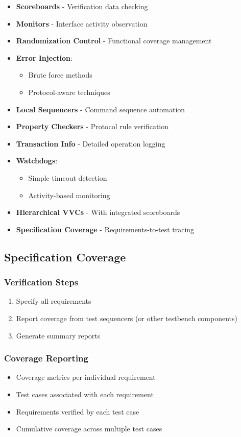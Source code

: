 \documentclass{article}
\begin{document}
\begin{itemize}
    \item \textbf{Scoreboards} - Verification data checking
    \item \textbf{Monitors} - Interface activity observation
    \item \textbf{Randomization Control} - Functional coverage management
    \item \textbf{Error Injection}:
    \begin{itemize}
        \item Brute force methods
        \item Protocol-aware techniques
    \end{itemize}
    \item \textbf{Local Sequencers} - Command sequence automation
    \item \textbf{Property Checkers} - Protocol rule verification
    \item \textbf{Transaction Info} - Detailed operation logging
    \item \textbf{Watchdogs}:
    \begin{itemize}
        \item Simple timeout detection
        \item Activity-based monitoring
    \end{itemize}
    \item \textbf{Hierarchical VVCs} - With integrated scoreboards
    \item \textbf{Specification Coverage} - Requirements-to-test tracing
\end{itemize}

\subsection{Specification Coverage}

\subsubsection*{Verification Steps}
\begin{enumerate}
    \item Specify all requirements
    \item Report coverage from test sequencers (or other testbench components)
    \item Generate summary reports
\end{enumerate}

\subsubsection*{Coverage Reporting}
\begin{itemize}
    \item Coverage metrics per individual requirement
    \item Test cases associated with each requirement
    \item Requirements verified by each test case
    \item Cumulative coverage across multiple test cases
\end{itemize}
\end{document}
